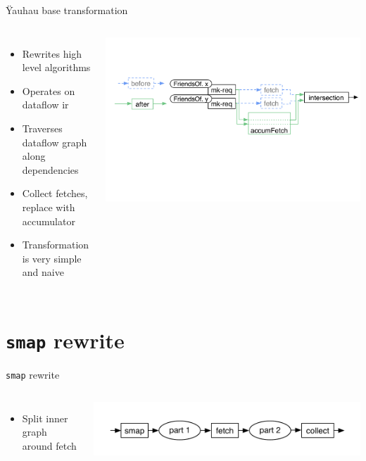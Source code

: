 \documentclass[utf8x,10pt,aspectratio=169]{beamer}
\begin{document}
\begin{frame}[fragile]{Ÿauhau base transformation}
	
	\begin{columns}[T]
		\begin{itemize}
			\item Rewrites high level algorithms
			\item Operates on dataflow ir
			\item Traverses dataflow graph along dependencies
			\item<2-> Collect fetches, replace with accumulator
			\item<3-> Transformation is very simple and naive
		\end{itemize}	
		\includegraphics[width=\textwidth]{graphs/yauhau-transformation}
	\end{columns}
	
\end{frame}

\section{\texttt{smap} rewrite}
\begin{frame}{\texttt{smap} rewrite}
	\begin{columns}
		\begin{itemize}
			\item Split inner graph around fetch
		\end{itemize}
		\includegraphics[width=\textwidth]{graphs/smap-rewrite-original}
	\end{columns}
		
\end{frame}
\end{document}
